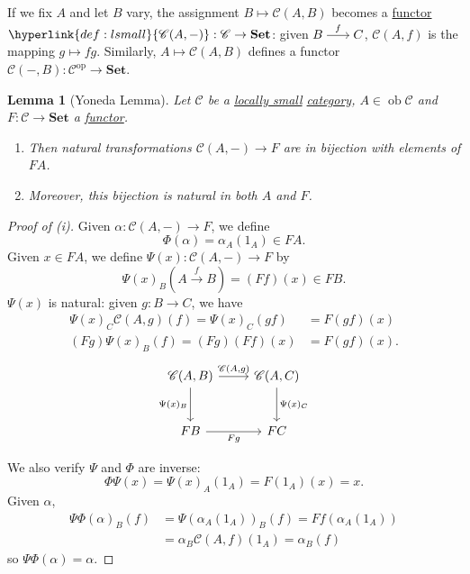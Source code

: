 \documentclass{article}
\DeclareMathOperator{\ob}{ob}
\newenvironment{tikzcdi}{\begin{tikzcd}[cramped, sep=scriptsize]}{\end{tikzcd}}
\newtheorem{nlemma}[nthm]{Lemma}
\begin{document}
 If we fix $A$ and let $B$ vary, the assignment $B \mapsto \mathscr{C}(A,B)$ becomes a \hyperlink{def:funct}{functor} $\hyperlink{def:lsmall}{\mathscr{C}(A, -)} : \mathscr{C} \to \mathbf{Set}$: given $\begin{tikzcdi} B \rar{f} & C \end{tikzcdi}$, $\mathscr{C}(A,f)$ is the mapping $g \mapsto fg$.
Similarly, $A \mapsto \mathscr{C}(A,B)$ defines a functor $\mathscr{C}(-, B): \mathscr{C}^\text{op} \to \mathbf{Set}$.
\begin{nlemma}[Yoneda Lemma]\label{lem:2.2}
  Let $\mathscr{C}$ be a \hyperlink{def:lsmall}{locally small} \hyperlink{def:cat}{category}, $A \in \ob \mathscr{C}$ and $F: \mathscr{C} \to \mathbf{Set}$ a \hyperlink{def:funct}{functor}.
  \begin{enumerate}[label=(\roman*)]
    \item Then natural transformations $\mathscr{C}(A, -) \to F$ are in bijection with elements of $FA$.
    \item Moreover, this bijection is natural in both $A$ and $F$.
  \end{enumerate}
\end{nlemma}
\begin{proof}[Proof of (i)]
  Given $\alpha: \mathscr{C}(A,-) \to F$, we define
  \begin{equation*}
    \Phi(\alpha) = \alpha_A(1_A) \in FA.
  \end{equation*}
  Given $x \in FA$, we define $\Psi(x) : \mathscr{C}(A,-) \to F$ by
  \begin{equation*}\Psi(x)_B(A \xrightarrow{f} B) = (Ff)(x) \in FB.\end{equation*}
  $\Psi(x)$ is natural: given $g: B \to C$, we have
  \begin{align*}
    \Psi(x)_C \mathscr{C}(A,g)(f) = \Psi(x)_C(gf) &= F(gf)(x) \\
    (Fg)\Psi(x)_B(f) = (Fg)(Ff)(x) &= F(gf)(x).
  \end{align*}
  \begin{equation*}
    \begin{tikzcd}[row sep=large]
    {\mathscr{C}(A,B)} \arrow[r, "{\mathscr{C}(A,g)}"] \arrow[d, "\Psi(x)_B"'] & {\mathscr{C}(A,C)} \arrow[d, "\Psi(x)_C"] \\
    FB \arrow[r, "Fg"'] & FC
    \end{tikzcd}
  \end{equation*}

  We also verify $\Psi$ and $\Phi$ are inverse:
  \begin{equation*}
    \Phi \Psi(x) = \Psi(x)_A(1_A) = F(1_A)(x) = x.
  \end{equation*}
  Given $\alpha$,
  \begin{align*}
    \Psi\Phi(\alpha)_B(f) &= \Psi(\alpha_A(1_A))_B(f) = Ff(\alpha_A(1_A)) \\
                          &= \alpha_B \mathscr{C}(A,f) (1_A) = \alpha_B(f)
  \end{align*}
  so $\Psi \Phi(\alpha) = \alpha$.
\end{proof}
\end{document}
